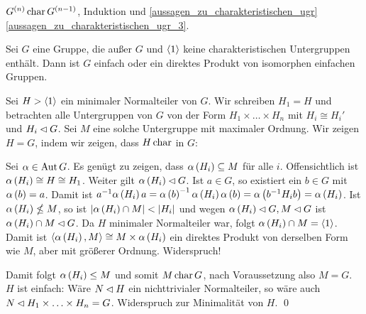 \begin{beweis}
 $G^{\left(n\right)} \operatorname{char} G^{\left(n-1\right)}$, Induktion und \ref{aussagen_zu_charakteristischen_ugr} \ref{aussagen_zu_charakteristischen_ugr_3}.
\end{beweis}

\begin{satz}
 Sei $G$ eine Gruppe, die au\ss{}er $G$ und $\left<1\right>$ keine charakteristischen Untergruppen enth\"alt. Dann ist $G$ einfach oder ein direktes Produkt von isomorphen einfachen Gruppen.
\end{satz}

\begin{beweis}
 Sei $H > \left<1\right>$ ein minimaler Normalteiler von $G$. Wir schreiben $H_1 = H$ und betrachten alle Untergruppen von $G$ von der Form $H_1 \times \ldots \times H_n$ mit $H_i \cong H_i'$ und $H_i \lhd G$. Sei $M$ eine solche Untergruppe mit maximaler Ordnung. Wir zeigen $H=G$, indem wir zeigen, dass $H \operatorname{char} $ in $G$:

 Sei $\alpha \in \operatorname{Aut} G$. Es gen\"ugt zu zeigen, dass $\alpha\left(H_i\right) \subseteq M$ f\"ur alle $i$. Offensichtlich ist $\alpha\left(H_i\right) \cong H \cong H_1$. Weiter gilt $\alpha\left(H_i\right) \lhd G$. Ist $a \in G$, so existiert ein $b \in G$ mit $\alpha\left(b\right)=a$. Damit ist $a^{-1}\alpha\left(H_i\right)a=\alpha\left(b\right)^{-1}\alpha\left(H_i\right)\alpha\left(b\right)=\alpha\left(b^{-1}H_ib\right)=\alpha\left(H_i\right)$. Ist $\alpha\left(H_i\right) \nleq M$, so ist $\left|\alpha\left(H_i\right) \cap M\right| < \left|H_i\right|$ und wegen $\alpha\left(H_i\right) \lhd G, M \lhd G$ ist $\alpha\left(H_i\right) \cap M \lhd G$. Da $H$ minimaler Normalteiler war, folgt $\alpha\left(H_i\right) \cap M = \left<1\right>$. Damit ist $\left<\alpha\left(H_i\right), M\right> \cong M \times \alpha\left(H_i\right)$ ein direktes Produkt von derselben Form wie $M$, aber mit gr\"o\ss{}erer Ordnung. Widerspruch!

 Damit folgt $\alpha\left(H_i\right) \leq M$ und somit $M \operatorname{char} G$, nach Voraussetzung also $M=G$. $H$ ist einfach: W\"are $N \lhd H$ ein nichttrivialer Normalteiler, so w\"are auch $N \lhd H_1 \times \ldots \times H_n = G$. Widerspruch zur Minimalit\"at von $H$.
 \qed
\end{beweis}
